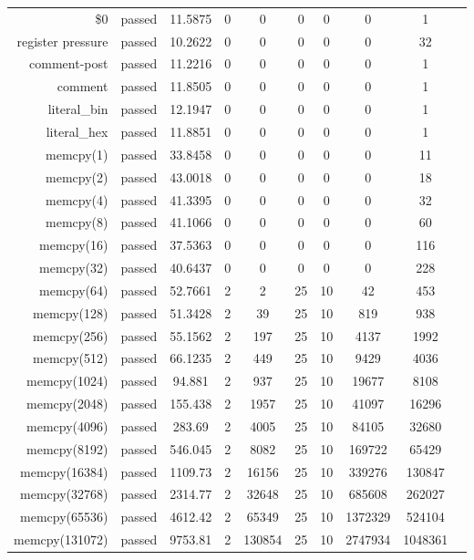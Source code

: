 \begin{longtable}{r|ccccccccc}
    \$0 & passed & 11.5875 & 0 & 0 & 0 & 0 & 0 & 1 \\
    register pressure & passed & 10.2622 & 0 & 0 & 0 & 0 & 0 & 32 \\
    comment-post & passed & 11.2216 & 0 & 0 & 0 & 0 & 0 & 1 \\
    comment & passed & 11.8505 & 0 & 0 & 0 & 0 & 0 & 1 \\
    literal\_bin & passed & 12.1947 & 0 & 0 & 0 & 0 & 0 & 1 \\
    literal\_hex & passed & 11.8851 & 0 & 0 & 0 & 0 & 0 & 1 \\
    memcpy(1) & passed & 33.8458 & 0 & 0 & 0 & 0 & 0 & 11 \\
    memcpy(2) & passed & 43.0018 & 0 & 0 & 0 & 0 & 0 & 18 \\
    memcpy(4) & passed & 41.3395 & 0 & 0 & 0 & 0 & 0 & 32 \\
    memcpy(8) & passed & 41.1066 & 0 & 0 & 0 & 0 & 0 & 60 \\
    memcpy(16) & passed & 37.5363 & 0 & 0 & 0 & 0 & 0 & 116 \\
    memcpy(32) & passed & 40.6437 & 0 & 0 & 0 & 0 & 0 & 228 \\
    memcpy(64) & passed & 52.7661 & 2 & 2 & 25 & 10 & 42 & 453 \\
    memcpy(128) & passed & 51.3428 & 2 & 39 & 25 & 10 & 819 & 938 \\
    memcpy(256) & passed & 55.1562 & 2 & 197 & 25 & 10 & 4137 & 1992 \\
    memcpy(512) & passed & 66.1235 & 2 & 449 & 25 & 10 & 9429 & 4036 \\
    memcpy(1024) & passed & 94.881 & 2 & 937 & 25 & 10 & 19677 & 8108 \\
    memcpy(2048) & passed & 155.438 & 2 & 1957 & 25 & 10 & 41097 & 16296 \\
    memcpy(4096) & passed & 283.69 & 2 & 4005 & 25 & 10 & 84105 & 32680 \\
    memcpy(8192) & passed & 546.045 & 2 & 8082 & 25 & 10 & 169722 & 65429 \\
    memcpy(16384) & passed & 1109.73 & 2 & 16156 & 25 & 10 & 339276 & 130847 \\
    memcpy(32768) & passed & 2314.77 & 2 & 32648 & 25 & 10 & 685608 & 262027 \\
    memcpy(65536) & passed & 4612.42 & 2 & 65349 & 25 & 10 & 1372329 & 524104 \\
    memcpy(131072) & passed & 9753.81 & 2 & 130854 & 25 & 10 & 2747934 & 1048361 \\

\end{longtable}
